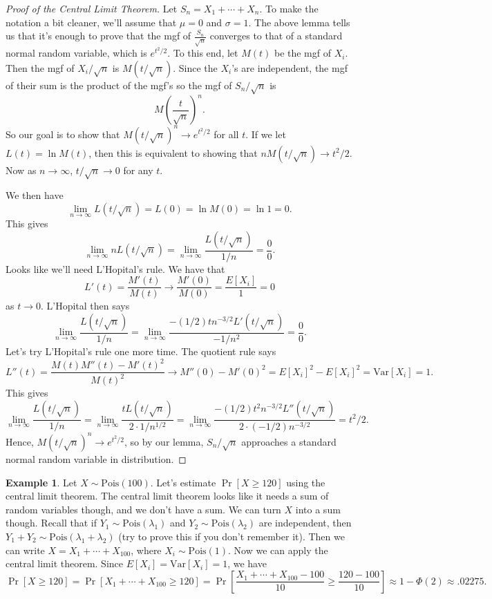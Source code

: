 \documentclass[12pt]{article}
\theoremstyle{plain}
\theoremstyle{definition}
\newtheorem{example}[theorem]{Example}
\theoremstyle{remark}
\newcommand{\Var}{\ensuremath{\textrm{Var}}}
\newcommand{\Pois}{\ensuremath{\textrm{Pois}}}
\begin{document}
\begin{proof}[Proof of the Central Limit Theorem]
    Let $S_n = X_1 + \cdots + X_n$.
    To make the notation a bit cleaner, we'll assume that $\mu= 0$ and $\sigma = 1$.
    The above lemma tells us that it's enough to prove that the mgf of $\frac{S_n}{\sqrt{n}}$ converges to that of a standard normal random variable, which is $e^{t^2/2}$.
    To this end, let $M(t)$ be the mgf of $X_i$.
    Then the mgf of $X_i/\sqrt{n}$ is $M(t/\sqrt{n})$.
    Since the $X_i$'s are independent, the mgf of their sum is the product of the mgf's so the mgf of $S_n/\sqrt{n}$ is
    \[
        M\left(\frac{t}{\sqrt{n}}\right)^n.
    \]
    So our goal is to show that $M(t/\sqrt{n})^n \to e^{t^2/2}$ for all $t$.
    If we let $L(t) = \ln M(t)$, then this is equivalent to showing that $n M(t/\sqrt n) \to t^2/2$.
    Now as $n\to \infty$, $t/\sqrt{n}\to 0$ for any $t$.

    We then have
    \[
        \lim_{n\to \infty}L(t/\sqrt{n}) = L(0) = \ln M(0) = \ln 1 = 0.
    \]
    This gives
    \[
        \lim_{n\to \infty}nL(t/\sqrt{n}) = \lim_{n\to \infty}\frac{L(t/\sqrt{n})}{1/n} = \frac{0}{0}.
    \]
    Looks like we'll need L'Hopital's rule.
    We have that
    \[
        L'(t) = \frac{M'(t)}{M(t)} \to \frac{M'(0)}{M(0)} = \frac{E[X_i]}{1} = 0
    \]
    as $t\to 0$.
    L'Hopital then says
    \[
        \lim_{n\to \infty}\frac{L(t/\sqrt{n})}{1/n} = \lim_{n\to \infty}\frac{-(1/2)tn^{-3/2}L'(t/\sqrt{n})}{-1/n^2} = \frac{0}{0}.
    \]
    Let's try L'Hopital's rule one more time.
    The quotient rule says
    \[
        L''(t) = \frac{M(t)M''(t) - M'(t)^2}{M(t)^2} \to M''(0)-M'(0)^2  = E[X_i]^2-E[X_i]^2 = \Var[X_i] = 1.
    \]
    This gives
    \[
        \lim_{n\to \infty}\frac{L(t/\sqrt{n})}{1/n} = \lim_{n\to \infty}\frac{tL(t/\sqrt n)}{2\cdot 1/n^{1/2}} = \lim_{n\to \infty}\frac{-(1/2)t^2n^{-3/2}L''(t/\sqrt n)}{2\cdot (-1/2)n^{-3/2}} = t^2/2.
    \]
    Hence, $M(t/\sqrt n)^n \to e^{t^2/2}$, so by our lemma, $S_n/\sqrt n$ approaches a standard normal random variable in distribution.
\end{proof}

\begin{example}
    Let $X\sim \Pois(100)$.
    Let's estimate $\Pr[X \geq 120]$ using the central limit theorem.
    The central limit theorem looks like it needs a sum of random variables though, and we don't have a sum.
    We can turn $X$ into a sum though.
    Recall that if $Y_1\sim \Pois(\lambda_1)$ and $Y_2\sim \Pois(\lambda_2)$ are independent, then $Y_1+Y_2\sim\Pois(\lambda_1+\lambda_2)$ (try to prove this if you don't remember it).
    Then we can write $X = X_1 + \cdots + X_{100}$, where $X_i\sim \Pois(1)$.
    Now we can apply the central limit theorem.
    Since $E[X_i] = \Var[X_i] = 1$, we have
    \[
        \Pr[X \geq 120] = \Pr[X_1 + \cdots + X_{100} \geq 120] = \Pr\left[\frac{X_1 + \cdots + X_{100}- 100}{10} \geq \frac{120-100}{10}\right] \approx 1-\Phi(2) \approx .02275.
    \]
\end{example}
\end{document}
